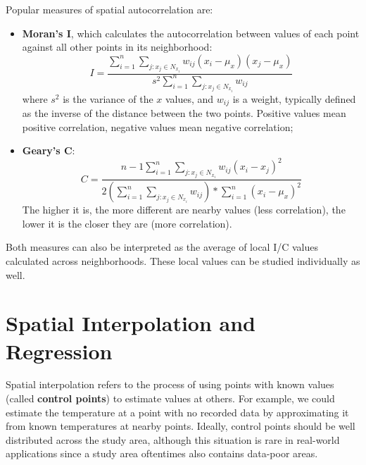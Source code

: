 Popular measures of spatial autocorrelation are:    
\begin{itemize}
    \item \textbf{Moran's I}, which calculates the autocorrelation between values of each point against all other points in its neighborhood:
    \begin{equation*}
        I = \frac{\sum_{i=1}^n \sum_{j: x_j \in N_{x_i}} w_{ij} (x_i - \mu_x)(x_j - \mu_x)}{s^2 \sum_{i=1}^n \sum_{j: x_j \in N_{x_i}} w_{ij}} 
    \end{equation*}
    where $s^2$ is the variance of the $x$ values, and $w_{ij}$ is a weight, typically defined as the inverse of the distance between the two points. Positive values mean positive correlation, negative values mean negative correlation;
    \item \textbf{Geary's C}:
    \begin{equation*}
        C = \frac{n-1 \sum_{i=1}^n \sum_{j: x_j \in N_{x_i}} w_{ij} (x_i - x_j)^2}{2 (\sum_{i=1}^n \sum_{j: x_j \in N_{x_i}} w_{ij}) * \sum_{i=1}^n (x_i - \mu_x)^2}
    \end{equation*}
    The higher it is, the more different are nearby values (less correlation), the lower it is the closer they are (more correlation).
\end{itemize}
Both measures can also be interpreted as the average of local I/C values calculated across neighborhoods. These local values can be studied individually as well.

\section{Spatial Interpolation and Regression}

Spatial interpolation refers to the process of using points with known values (called \textbf{control points}) to estimate values at others. For example, we could estimate the temperature at a point with no recorded data by approximating it from known temperatures at nearby points. Ideally, control points should be well distributed across the study area, although this situation is rare in real-world applications since a study area oftentimes also contains data-poor areas.

